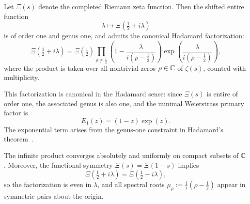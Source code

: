 \begin{lemma}
\label{lem:hadamard_linear_form}
Let \( \Xi(s) \) denote the completed Riemann zeta function. Then the shifted entire function
\[
\lambda \mapsto \Xi\left( \tfrac{1}{2} + i\lambda \right)
\]
is of order one and genus one, and admits the canonical Hadamard factorization:
\[
\Xi\left( \tfrac{1}{2} + i\lambda \right)
= \Xi\left( \tfrac{1}{2} \right)
\prod_{\rho \ne \frac{1}{2}} \left( 1 - \frac{\lambda}{i(\rho - \frac{1}{2})} \right)
\exp\left( \frac{\lambda}{i(\rho - \frac{1}{2})} \right),
\]
where the product is taken over all nontrivial zeros \( \rho \in \mathbb{C} \) of \( \zeta(s) \), counted with multiplicity.

\medskip
\noindent
This factorization is canonical in the Hadamard sense: since \( \Xi(s) \) is entire of order one, the associated genus is also one, and the minimal Weierstrass primary factor is
\[
E_1(z) = (1 - z)\exp(z).
\]
The exponential term arises from the genus-one constraint in Hadamard’s theorem~\cite[Ch.~9]{Levin1996EntireLectures}.

\medskip
\noindent
The infinite product converges absolutely and uniformly on compact subsets of \( \mathbb{C} \). Moreover, the functional symmetry \( \Xi(s) = \Xi(1 - s) \) implies
\[
\Xi\left( \tfrac{1}{2} + i\lambda \right) = \Xi\left( \tfrac{1}{2} - i\lambda \right),
\]
so the factorization is even in \( \lambda \), and all spectral roots \( \mu_\rho := \tfrac{1}{i}(\rho - \tfrac{1}{2}) \) appear in symmetric pairs about the origin.
\end{lemma}
